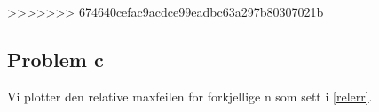 \documentclass[english,notitlepage]{revtex4-1}  %
\begin{document}

>>>>>>> 674640cefac9acdce99eadbc63a297b80307021b
\subsection*{Problem c}

Vi plotter den relative maxfeilen for forkjellige n som sett i \ref{relerr}.
\end{document}

